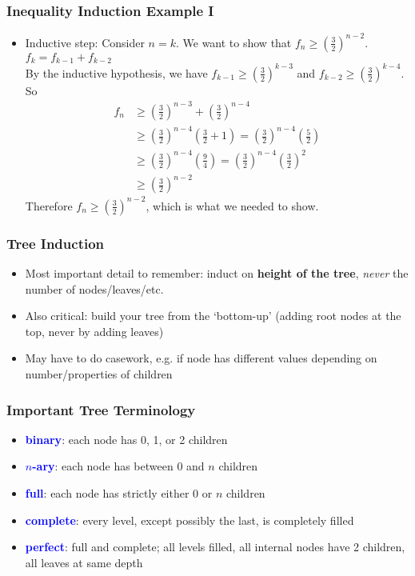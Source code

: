 \documentclass{beamer}
\begin{document}
\begin{frame}[t]
  \frametitle{Inequality Induction Example I}
  \begin{itemize}
    \item Inductive step: Consider $n=k$. We want to show that $f_n \geq (\frac{3}{2})^{n-2}$. \\
    $f_{k} = f_{k-1} + f_{k-2}$ \\
    By the inductive hypothesis, we have $f_{k-1} \geq \left(\frac{3}{2}\right)^{k-3}$ and $f_{k-2} \geq \left(\frac{3}{2}\right)^{k-4}$. 
    So \begin{align*}
f_n &\geq \left(\frac{3}{2}\right)^{n-3} + \left(\frac{3}{2}\right)^{n-4} \\
&\geq \left(\frac{3}{2}\right)^{n-4}\left(\frac{3}{2} + 1\right) = \left(\frac{3}{2}\right)^{n-4}\left(\frac{5}{2}\right) \\
&\geq \left(\frac{3}{2}\right)^{n-4}\left(\frac{9}{4}\right) = \left(\frac{3}{2}\right)^{n-4}\left(\frac{3}{2}\right)^2 \\
&\geq \left(\frac{3}{2}\right)^{n-2} 
\end{align*} 
    Therefore $f_n \geq \left(\frac{3}{2}\right)^{n-2}$, which is what we needed to show.
  \end{itemize}
\end{frame}

\begin{frame}[t]
  \frametitle{Tree Induction}
  \begin{itemize}[<+->]
      \item Most important detail to remember: induct on \textbf{height of the tree}, \textit{never} the number of nodes/leaves/etc.
      \item Also critical: build your tree from the `bottom-up' (adding root nodes at the top, never by adding leaves)
      \item May have to do casework, e.g. if node has different values depending on number/properties of children
    \end{itemize}

\end{frame}

\begin{frame}[t]
  \frametitle{Important Tree Terminology}
  \begin{itemize}
      \item \textcolor{blue}{\textbf{binary}}: each node has 0, 1, or 2 children
      \item \textcolor{blue}{\textbf{$n$-ary}}: each node has between $0$ and $n$ children
      \item \textcolor{blue}{\textbf{full}}: each node has strictly either 0 or $n$ children
      \item \textcolor{blue}{\textbf{complete}}: every level, except possibly the last, is completely filled
      \item \textcolor{blue}{\textbf{perfect}}: full and complete; all levels filled, all internal nodes have 2 children, all leaves at same depth
    \end{itemize}

\end{frame}
\end{document}
